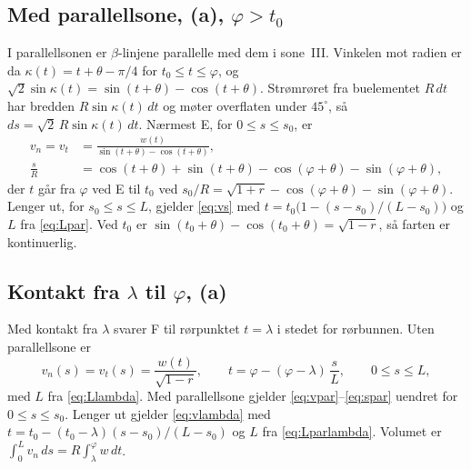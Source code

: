 \documentclass[11pt,a4paper]{article}
\begin{document}
\subsection*{Med parallellsone, (a), $\varphi > t_0$}

I parallellsonen er $\beta$-linjene parallelle med dem i sone~III.  Vinkelen
mot radien er da $\kappa(t) = t + \theta - \pi/4$ for $t_0 \le t \le
\varphi$, og $\sqrt2\sin\kappa(t) = \sin(t + \theta) - \cos(t + \theta)$.
Strømrøret fra buelementet $R\,dt$ har bredden $R\sin\kappa(t)\,dt$ og
møter overflaten under $45^\circ$, så $ds = \sqrt2\,R\sin\kappa(t)\,dt$.
Nærmest E, for $0 \le s \le s_0$, er
\begin{align}
  v_n = v_t &= \frac{w(t)}{\sin(t + \theta) - \cos(t + \theta)} ,
  \label{eq:vpar} \\
  \frac{s}{R} &= \cos(t + \theta) + \sin(t + \theta)
                 - \cos(\varphi + \theta) - \sin(\varphi + \theta) ,
  \label{eq:spar}
\end{align}
der $t$ går fra $\varphi$ ved E til $t_0$ ved
$s_0/R = \sqrt{1 + r} - \cos(\varphi + \theta) - \sin(\varphi + \theta)$.
Lenger ut, for $s_0 \le s \le L$, gjelder \eqref{eq:vs} med
$t = t_0\bigl(1 - (s - s_0)/(L - s_0)\bigr)$ og $L$ fra \eqref{eq:Lpar}.
Ved $t_0$ er $\sin(t_0 + \theta) - \cos(t_0 + \theta) = \sqrt{1 - r}$, så
farten er kontinuerlig.

\subsection*{Kontakt fra $\lambda$ til $\varphi$, (a)}

Med kontakt fra $\lambda$ svarer F til rørpunktet $t = \lambda$ i stedet for
rørbunnen.  Uten parallellsone er
\begin{equation}
  v_n(s) = v_t(s) = \frac{w(t)}{\sqrt{1 - r}} ,
  \qquad t = \varphi - (\varphi - \lambda)\,\frac{s}{L} ,
  \qquad 0 \le s \le L ,
  \label{eq:vlambda}
\end{equation}
med $L$ fra \eqref{eq:Llambda}.  Med parallellsone gjelder
\eqref{eq:vpar}--\eqref{eq:spar} uendret for $0 \le s \le s_0$.  Lenger ut
gjelder \eqref{eq:vlambda} med $t = t_0 - (t_0 - \lambda)(s - s_0)/(L - s_0)$
og $L$ fra \eqref{eq:Lparlambda}.  Volumet er
$\int_0^L v_n\,ds = R\int_\lambda^\varphi w\,dt$.
\end{document}
